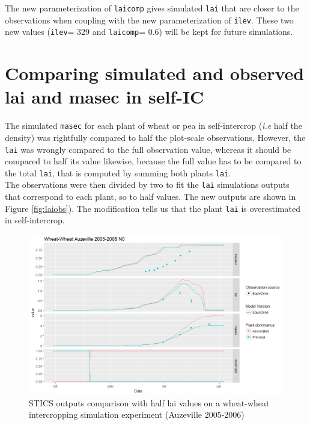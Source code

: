 \documentclass[]{book}
\begin{document}
The new parameterization of \texttt{laicomp} gives simulated \texttt{lai} that are closer to the observations when coupling with the new parameterization of \texttt{ilev}. These two new values (\texttt{ilev}= 329 and \texttt{laicomp}= 0.6) will be kept for future simulations.

\hypertarget{comparing-simulated-and-observed-lai-and-masec-in-self-ic}{%
\section{Comparing simulated and observed lai and masec in self-IC}\label{comparing-simulated-and-observed-lai-and-masec-in-self-ic}}

The simulated \texttt{masec} for each plant of wheat or pea in self-intercrop (\emph{i.e} half the density) was rightfully compared to half the plot-scale observations. However, the \texttt{lai} was wrongly compared to the full observation value, whereas it should be compared to half its value likewise, because the full value has to be compared to the total \texttt{lai}, that is computed by summing both plants \texttt{lai}.\\
The observations were then divided by two to fit the \texttt{lai} simulations outputs that correspond to each plant, so to half values.
The new outputs are shown in Figure \ref{fig:laiobs}). The modification tells us that the plant \texttt{lai} is overestimated in self-intercrop.

\begin{figure}
\centering
\includegraphics{img/laiobs.png}
\caption{\label{fig:laicomp}STICS outputs comparison with half lai values on a wheat-wheat intercropping simulation experiment (Auzeville 2005-2006)}
\end{figure}
\end{document}
